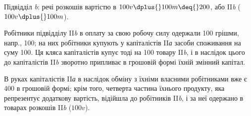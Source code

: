 Підвідділ \emph{b}: речі розкошів вартістю в $100 v \dplus{} 100 m \deq{} 200$, або
II\emph{b} ($100 v \dplus{} 100 m$).

Робітники підвідділу II\emph{b} в оплату за свою робочу силу одержали
100 грішми, напр., 100; на них робітники купують у капіталістів
II\emph{а} засоби споживання на суму 100. Ця кляса капіталістів купує
тоді на 100 товару II\emph{b}, і в наслідок цього до капіталістів II\emph{b}
зворотно припливає в грошовій формі їхній змінний капітал.

В руках капіталістів II\emph{а} в наслідок обміну з їхніми власними робітниками
вже є 400 в грошовій формі; крім того, четверта частина їхнього
продукту, яка репрезентує додаткову вартість, відійшла до робітників
II\emph{b}, і за неї одержано в товарах розкошів II\emph{b} ($100 v$).
